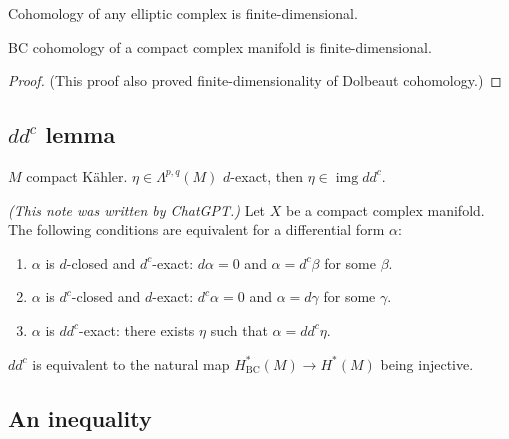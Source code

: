 \begin{coro}\leavevmode
Cohomology of any elliptic complex is finite-dimensional.
\end{coro}

\begin{thm}\leavevmode
BC cohomology of a compact complex manifold is finite-dimensional.
\end{thm}

\begin{proof}\leavevmode
	(This proof also proved finite-dimensionality of Dolbeaut cohomology.)
\end{proof}

\subsection{\(d d^c\) lemma}

\begin{thm}[\(d d^c\) lemma]\leavevmode
\(M\) compact Kähler. \(\eta \in \Lambda^{p,q}(M)\) \(d\)-exact, then \(\eta \in \operatorname{img} d d^c\).
\end{thm}

\begin{lemma}[\( d d^c \)-Lemma]
    \textit{(This note was written by ChatGPT.)} 
    Let \( X \) be a compact complex manifold. The following conditions are equivalent for a differential form \( \alpha \):
    \begin{enumerate}
        \item \( \alpha \) is \( d \)-closed and \( d^c \)-exact: \( d \alpha = 0 \) and \( \alpha = d^c \beta \) for some \( \beta \).
        \item \( \alpha \) is \( d^c \)-closed and \( d \)-exact: \( d^c \alpha = 0 \) and \( \alpha = d \gamma \) for some \( \gamma \).
        \item \( \alpha \) is \( d d^c \)-exact: there exists \( \eta \) such that \( \alpha = d d^c \eta \).
    \end{enumerate}
\end{lemma}

\begin{remark}\leavevmode
	\(d d^c\) is equivalent to the natural map \(H^*_{\operatorname{BC}}(M) \to H^{*}(M)\) being injective.
\end{remark}

\subsection{An inequality}

